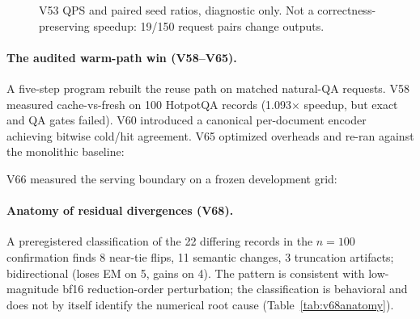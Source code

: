 \begin{figure}[H]
\centering\resizebox{.76\linewidth}{!}{}
\caption{V53 QPS and paired seed ratios, diagnostic only. Not a
correctness-preserving speedup: 19/150 request pairs change outputs.}
\label{fig:qps}
\end{figure}

\paragraph{The audited warm-path win (V58--V65).}
A five-step program rebuilt the reuse path on matched natural-QA requests.
V58 measured cache-vs-fresh on 100 HotpotQA records (1.093$\times$
speedup, but exact and QA gates failed). V60 introduced a canonical
per-document encoder achieving bitwise cold/hit agreement. V65 optimized
overheads and re-ran against the monolithic baseline:

\begin{table}[H]
\centering\footnotesize
\caption{Audited warm-path result (V65, seed 47, bootstrap CIs). All-hit
reuse: 2.05$\times$ TTFT, byte-identical on 24 frozen records, 1.43$\times$
end-to-end. Mixed-hit traffic remains slower. Cold canonical prefill is
3.27$\times$ slower than monolithic.}
\label{tab:v65serving}
\end{table}

V66 measured the serving boundary on a frozen development grid:

\begin{table}[H]
\centering\footnotesize
\caption{Serving boundary (V66). Frozen V62 dev split, seed 47, 15 timed
repeats per cell. Cells give the smallest tested winning configuration per
shape as $h_{\mathrm{eff}}{=}$hit\_count$/N$ (wall at each decode budget and
TTFT); nominal grid labels are retained in the ledger. Development data
only; grid-specific boundaries, not universal thresholds.}
\label{tab:v66boundary}
\end{table}

\begin{table}[H]
\centering\footnotesize
\caption{TTFT geometry crossover (V59). Reuse loses at 32-token documents,
needs high hit rates at 128, wins at 512.}
\label{tab:v59crossover}
\end{table}

\paragraph{Anatomy of residual divergences (V68).}
A preregistered classification of the 22 differing records in the $n{=}100$
confirmation finds 8 near-tie flips, 11 semantic changes, 3 truncation
artifacts; bidirectional (loses EM on 5, gains on 4). The pattern is
consistent with low-magnitude bf16 reduction-order perturbation; the
classification is behavioral and does not by itself identify the numerical
root cause (Table~\ref{tab:v68anatomy}).

